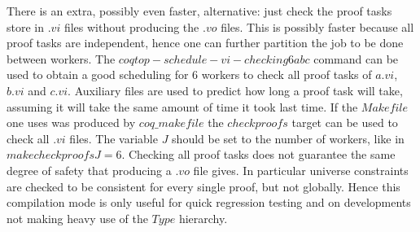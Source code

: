 There is an extra, possibly even faster, alternative: just check
the proof tasks store in $.vi$ files without producing the $.vo$ files.
This is possibly faster because all proof tasks are independent, hence
one can further partition the job to be done between workers.
The $coqtop -schedule-vi-checking 6 a b c$ command can be used to obtain
a good scheduling for 6 workers to check all proof tasks of $a.vi$, $b.vi$ and
$c.vi$.  Auxiliary files are used to predict how long a proof task will take,
assuming it will take the same amount of time it took last time.
If the $Makefile$ one uses was produced by $coq\_makefile$ the $checkproofs$
target can be used to check all $.vi$ files.  The variable $J$ should be
set to the number of workers, like in $make checkproofs J=6$.
Checking all proof tasks does not guarantee the same degree of safety
that producing a $.vo$ file gives.  In particular universe constraints
are checked to be consistent for every single proof, but not globally.
Hence this compilation mode is only useful for quick regression testing
and on developments not making heavy use of the $Type$ hierarchy.

